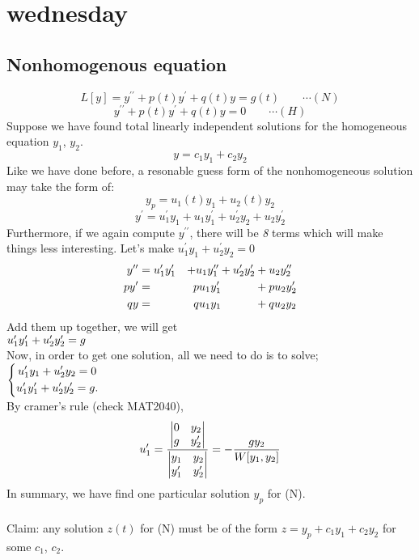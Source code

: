 

\section{wednesday}
\subsection{Nonhomogenous equation}
\[L[y]=y^{\prime\prime}+p(t)y^\prime+q(t)y=g(t)\qquad\cdots(N)
\]
\[y^{\prime\prime}+p(t)y^\prime+q(t)y=0\qquad\cdots(H)\]
Suppose we have found total linearly independent solutions for the homogeneous equation $y_1$, $y_2$.
\[y=c_1y_1+c_2y_2
\]
Like we have done before, a resonable guess form of the nonhomogeneous solution may take the form of:
\[y_p=u_1(t)y_1+u_2(t)y_2
\]
\[y^\prime=u_1^\prime y_1+u_1y_1^\prime+u_2^\prime y_2+u_2y_2^\prime
\]
Furthermore, if we again compute $y^{\prime\prime}$, there will be  \emph{8} terms which will make things less interesting. Let's make $u_1^\prime y_1+u_2^\prime y_2=0$\\
\[
\begin{aligned}
y^{\prime\prime}&=u_1^\prime y_1^{\prime}&+u_1y_1^{\prime\prime}+u_2^{\prime} y_2^{\prime}&+u_2y_2^{\prime\prime}\\
py^{\prime}&=&pu_1y_1^{\prime}\qquad\quad&+pu_2y_2^{\prime}
\\
qy&=&qu_1y_1\qquad\quad&+qu_2y_2
\end{aligned}\]
Add them up together, we will get\\
$u_1^{\prime} y_1^{\prime}+u_2^{\prime} y_2^{\prime}=g$\\
Now, in order to get one solution, all we need to do is to solve;\\
$\left \{	\begin{gathered}
u_1^{\prime} y_1+u_2^{\prime} y_2=0\\
u_1^{\prime} y_1^{\prime}+u_2^{\prime} y_2^{\prime}=g.
\end{gathered}\right.$ \\
By cramer's rule (check MAT2040),
\[
u_1^{\prime}=\frac{\begin{vmatrix}0&y_2\\g&y_2^{\prime}\end{vmatrix}}{\begin{vmatrix}y_1&y_2\\y_1^{\prime}&y_2^{\prime}\end{vmatrix}}=-\frac{gy_2}{W[y_1,y_2]}
\]
In summary, we have find one particular solution $y_p$ for (N).\\
\\
Claim: any solution $z(t)$ for (N) must be of the form $z=y_p+c_1y_1+c_2y_2$ for some $c_1$, $c_2$.\\
